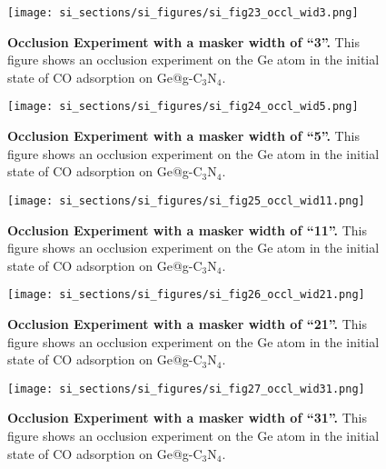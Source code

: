 \begin{figure}
  \centering
  \texttt{[image: si\_sections/si\_figures/si\_fig23\_occl\_wid3.png]}
  \caption{\textbf{Occlusion Experiment with a masker width of “3”.}
  This figure shows an occlusion experiment on the Ge atom in
  the initial state of CO adsorption on Ge@g-C$_3$N$_4$.}
  \label{si_fig23:occl_wid3}
\end{figure}


\begin{figure}
  \centering
  \texttt{[image: si\_sections/si\_figures/si\_fig24\_occl\_wid5.png]}
  \caption{\textbf{Occlusion Experiment with a masker width of “5”.}
  This figure shows an occlusion experiment on the Ge atom in
  the initial state of CO adsorption on Ge@g-C$_3$N$_4$.}
  \label{si_fig24:occl_wid5}
\end{figure}


\begin{figure}
  \centering
  \texttt{[image: si\_sections/si\_figures/si\_fig25\_occl\_wid11.png]}
  \caption{\textbf{Occlusion Experiment with a masker width of “11”.}
  This figure shows an occlusion experiment on the Ge atom in
  the initial state of CO adsorption on Ge@g-C$_3$N$_4$.}
  \label{si_fig25:occl_wid11}
\end{figure}


\begin{figure}
  \centering
  \texttt{[image: si\_sections/si\_figures/si\_fig26\_occl\_wid21.png]}
  \caption{\textbf{Occlusion Experiment with a masker width of “21”.}
  This figure shows an occlusion experiment on the Ge atom in
  the initial state of CO adsorption on Ge@g-C$_3$N$_4$.}
  \label{si_fig26:occl_wid21}
\end{figure}


\begin{figure}
  \centering
  \texttt{[image: si\_sections/si\_figures/si\_fig27\_occl\_wid31.png]}
  \caption{\textbf{Occlusion Experiment with a masker width of “31”.}
  This figure shows an occlusion experiment on the Ge atom in
  the initial state of CO adsorption on Ge@g-C$_3$N$_4$.}
  \label{si_fig27:occl_wid31}
\end{figure}


